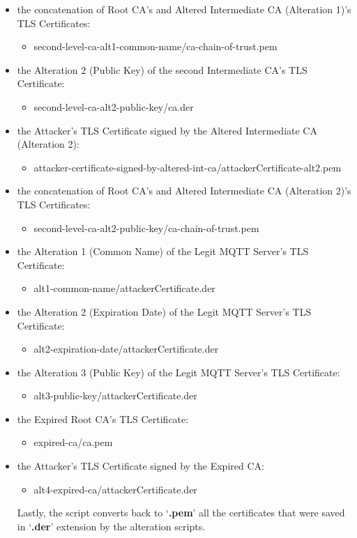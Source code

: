 \documentclass[binding=0.6cm,noexaminfo]{sapthesis}
\begin{document}
\begin{itemize}
\begin{itemize}
	\end{itemize}
	\item the concatenation of Root CA's and Altered Intermediate CA (Alteration 1)'s TLS Certificates:
	\begin{itemize}
		\item second-level-ca-alt1-common-name/ca-chain-of-trust.pem
	\end{itemize}
	\item the Alteration 2 (Public Key) of the second Intermediate CA's TLS Certificate:
	\begin{itemize}
		\item second-level-ca-alt2-public-key/ca.der
	\end{itemize}
	\item the Attacker's TLS Certificate signed by the Altered Intermediate CA (Alteration 2):
	\begin{itemize}
		\item attacker-certificate-signed-by-altered-int-ca/attackerCertificate-alt2.pem
	\end{itemize}
	\item the concatenation of Root CA's and Altered Intermediate CA (Alteration 2)'s TLS Certificates:
	\begin{itemize}
		\item second-level-ca-alt2-public-key/ca-chain-of-trust.pem
	\end{itemize}
	\item the Alteration 1 (Common Name) of the Legit MQTT Server's TLS Certificate:
	\begin{itemize}
		\item alt1-common-name/attackerCertificate.der
	\end{itemize}
	\item the Alteration 2 (Expiration Date) of the Legit MQTT Server's TLS Certificate:
	\begin{itemize}
		\item alt2-expiration-date/attackerCertificate.der
	\end{itemize}
	\item the Alteration 3 (Public Key) of the Legit MQTT Server's TLS Certificate:
	\begin{itemize}
		\item alt3-public-key/attackerCertificate.der
	\end{itemize}
	\item the Expired Root CA's TLS Certificate:
	\begin{itemize}
		\item expired-ca/ca.pem
	\end{itemize}
	\item the Attacker's TLS Certificate signed by the Expired CA:
	\begin{itemize}
		\item alt4-expired-ca/attackerCertificate.der
	\end{itemize}

Lastly, the script converts back to `\textbf{.pem}' all the certificates that were saved in `\textbf{.der}' extension by the alteration scripts.
\end{itemize}
\end{document}
